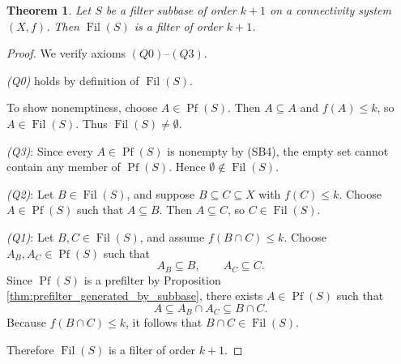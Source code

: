 \documentclass[10pt,a4paper]{amsart}
\newtheorem{theorem}{Theorem}
\begin{document}
\begin{theorem}
\label{thm:filter_generated_by_subbase}
Let \(S\) be a filter subbase of order \(k+1\) on a connectivity system \((X,f)\).
Then \(\operatorname{Fil}(S)\) is a filter of order \(k+1\).
\end{theorem}

\begin{proof}
We verify axioms \((Q0)\)--\((Q3)\).

\emph{(Q0)} holds by definition of \(\operatorname{Fil}(S)\).

To show nonemptiness, choose \(A\in \operatorname{Pf}(S)\).
Then \(A\subseteq A\) and \(f(A)\leq k\), so \(A\in \operatorname{Fil}(S)\).
Thus \(\operatorname{Fil}(S)\neq \emptyset\).

\emph{(Q3)}:
Since every \(A\in \operatorname{Pf}(S)\) is nonempty by (SB4), the empty set cannot contain any member of \(\operatorname{Pf}(S)\).
Hence \(\emptyset\notin \operatorname{Fil}(S)\).

\emph{(Q2)}:
Let \(B\in \operatorname{Fil}(S)\), and suppose \(B\subseteq C\subseteq X\) with \(f(C)\leq k\).
Choose \(A\in \operatorname{Pf}(S)\) such that \(A\subseteq B\).
Then \(A\subseteq C\), so \(C\in \operatorname{Fil}(S)\).

\emph{(Q1)}:
Let \(B,C\in \operatorname{Fil}(S)\), and assume \(f(B\cap C)\leq k\).
Choose \(A_B,A_C\in \operatorname{Pf}(S)\) such that
\[
A_B\subseteq B,\qquad A_C\subseteq C.
\]
Since \(\operatorname{Pf}(S)\) is a prefilter by Proposition \ref{thm:prefilter_generated_by_subbase},
there exists \(A\in \operatorname{Pf}(S)\) such that
\[
A\subseteq A_B\cap A_C \subseteq B\cap C.
\]
Because \(f(B\cap C)\leq k\), it follows that \(B\cap C\in \operatorname{Fil}(S)\).

Therefore \(\operatorname{Fil}(S)\) is a filter of order \(k+1\).
\end{proof}
\end{document}
